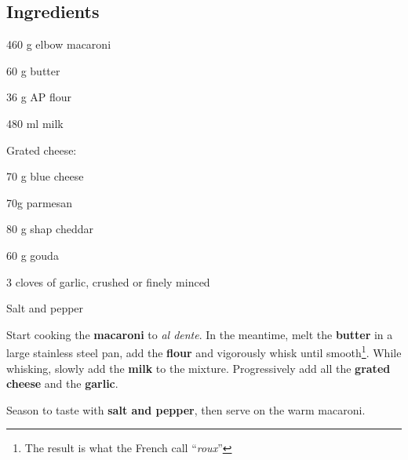 \newpage
{}

\subsection*{Ingredients}
\begin{ingredients}
	\item 460 g elbow macaroni
	\item 60 g butter
	\item 36 g AP flour
	\item 480 ml milk
	\item Grated cheese: 
	\begin{ingredients}
		\item 70 g blue cheese
		\item 70g parmesan
		\item 80 g shap cheddar
		\item 60 g gouda
	\end{ingredients}
	\item 3 cloves of garlic, crushed or finely minced
	\item Salt and pepper
\end{ingredients}

\medskip

Start cooking the \textbf{macaroni} to \textit{al dente}.
In the meantime, melt the \textbf{butter} in a large stainless steel pan, add the \textbf{flour} and vigorously whisk until smooth\footnote{The result is what the French call ``\textit{roux}''}. 
While whisking, slowly add the \textbf{milk} to the mixture.
Progressively add all the \textbf{grated cheese} and the \textbf{garlic}. 

Season to taste with \textbf{salt and pepper}, then serve on the warm macaroni.

\vspace*{0.75 cm}

\begin{recipeblock}
	
\end{recipeblock}